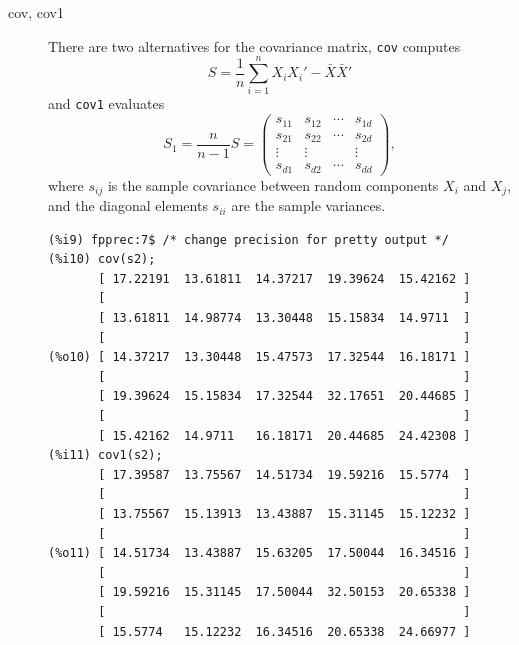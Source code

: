 \documentclass[12pt,a4paper]{article}
\begin{document}
\begin{description}

\item[cov, cov1] There are two alternatives for the covariance matrix, \verb|cov| computes
\[
S = \frac{1}{n} \sum_{i=1}^n X_i X_i' - \bar{X} \bar{X}'
\]
and \verb|cov1| evaluates
\[
S_1  =  \frac{n}{n-1}S 
     =    \left(
          \begin{array}{cccc}
          s_{11}  &  s_{12}  &  \cdots  &  s_{1d}  \\
          s_{21}  &  s_{22}  &  \cdots  &  s_{2d}  \\
          \vdots  &  \vdots  &          &  \vdots  \\
          s_{d1}  &  s_{d2}  &  \cdots  &  s_{dd}
          \end{array}
          \right),
\]
where $s_{ij}$ is the sample covariance between random components $X_i$ and $X_j$, and the diagonal elements $s_{ii}$ are the sample variances.

\begin{verbatim}
(%i9) fpprec:7$ /* change precision for pretty output */
(%i10) cov(s2);
       [ 17.22191  13.61811  14.37217  19.39624  15.42162 ]
       [                                                  ]
       [ 13.61811  14.98774  13.30448  15.15834  14.9711  ]
       [                                                  ]
(%o10) [ 14.37217  13.30448  15.47573  17.32544  16.18171 ]
       [                                                  ]
       [ 19.39624  15.15834  17.32544  32.17651  20.44685 ]
       [                                                  ]
       [ 15.42162  14.9711   16.18171  20.44685  24.42308 ]
(%i11) cov1(s2);
       [ 17.39587  13.75567  14.51734  19.59216  15.5774  ]
       [                                                  ]
       [ 13.75567  15.13913  13.43887  15.31145  15.12232 ]
       [                                                  ]
(%o11) [ 14.51734  13.43887  15.63205  17.50044  16.34516 ]
       [                                                  ]
       [ 19.59216  15.31145  17.50044  32.50153  20.65338 ]
       [                                                  ]
       [ 15.5774   15.12232  16.34516  20.65338  24.66977 ]
\end{verbatim}



\end{description}
\end{document}
